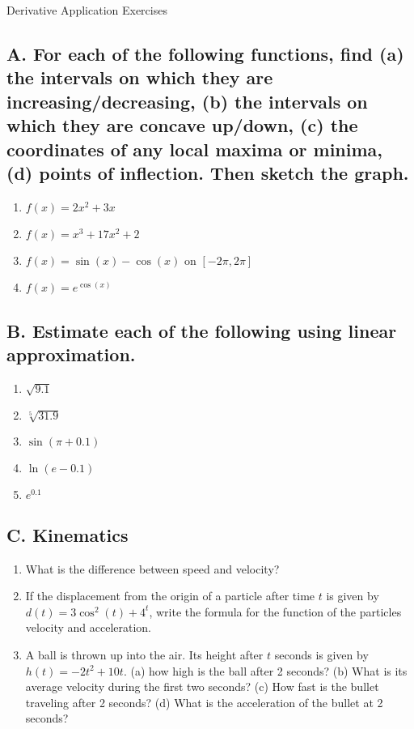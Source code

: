 \documentclass{article}
\begin{document}
\begin{center}
\begin{Huge}Derivative Application Exercises\end{Huge}
\end{center}


\subsection*{A. For each of the following functions, find (a) the intervals on which they are increasing/decreasing, (b) the intervals on which they are concave up/down, (c) the coordinates of any local maxima or minima, (d) points of inflection. Then sketch the graph.}

\begin{multicols}{2}
\begin{enumerate}
\item $f(x)=2x^2+3x$
\item $f(x)=x^3+17x^2+2$
\item $f(x)=\sin(x) - \cos(x)$ on $[-2\pi,2\pi]$
\item $f(x)=e^{\cos(x)}$
\end{enumerate}
\end{multicols}

\subsection*{B. Estimate each of the following using linear approximation.}

\begin{multicols}{5}
\begin{enumerate}
\item $\sqrt{9.1}$
\item $\sqrt[5]{31.9}$
\item $\sin(\pi + 0.1)$
\item $\ln(e-0.1)$
\item $e^{0.1}$
\end{enumerate}
\end{multicols}


\subsection*{C. Kinematics}
\begin{enumerate}
\item What is the difference between speed and velocity?
\item If the displacement from the origin of a particle after time $t$ is given by $d(t)=3\cos^2(t) + 4^t$, write the formula for the function of the particles velocity and acceleration.
\item A ball is thrown up into the air. Its height after $t$ seconds is given by $h(t)=-2t^2+10t$. (a) how high is the ball after 2 seconds? (b) What is its average velocity during the first two seconds? (c) How fast is the bullet traveling after 2 seconds? (d) What is the acceleration of the bullet at 2 seconds?
\end{enumerate}
\end{document}
